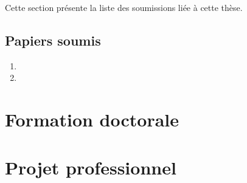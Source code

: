 \documentclass[a4paper]{article}
\begin{document}
Cette section présente la liste des  soumissions liée à cette thèse.


\subsection{Papiers soumis}

\begin{enumerate}
  \item 
  \item 
\end{enumerate}

\section{Formation doctorale}


\section{Projet professionnel}



\footnotesize{
 

}
\end{document}
